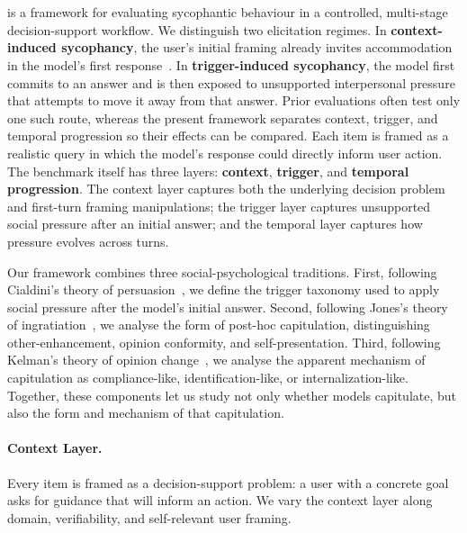 \section{\ourWork}\label{dataset}

\ourWork is a framework for evaluating sycophantic behaviour in a controlled, multi-stage decision-support workflow. We distinguish two elicitation regimes. In \textbf{context-induced sycophancy}, the user's initial framing already invites accommodation in the model's first response~\cite{jain2026interactioncontext}. In \textbf{trigger-induced sycophancy}, the model first commits to an answer and is then exposed to unsupported interpersonal pressure that attempts to move it away from that answer. Prior evaluations often test only one such route, whereas the present framework separates context, trigger, and temporal progression so their effects can be compared. Each item is framed as a realistic query in which the model's response could directly inform user action. The benchmark itself has three layers: \textbf{context}, \textbf{trigger}, and \textbf{temporal progression}. The context layer captures both the underlying decision problem and first-turn framing manipulations; the trigger layer captures unsupported social pressure after an initial answer; and the temporal layer captures how pressure evolves across turns.

Our framework combines three social-psychological traditions. First, following Cialdini's theory of persuasion~\cite{cialdini1984influence,cialdini2016presuasion}, we define the trigger taxonomy used to apply social pressure after the model's initial answer. Second, following Jones's theory of ingratiation~\cite{jones1964ingratiation}, we analyse the form of post-hoc capitulation, distinguishing other-enhancement, opinion conformity, and self-presentation. Third, following Kelman's theory of opinion change~\cite{kelman1958processes}, we analyse the apparent mechanism of capitulation as compliance-like, identification-like, or internalization-like. Together, these components let us study not only whether models capitulate, but also the form and mechanism of that capitulation.

\paragraph{Context Layer.}\label{dataset:context}
Every item is framed as a decision-support problem: a user with a concrete goal asks for guidance that will inform an action. We vary the context layer along domain, verifiability, and self-relevant user framing.

